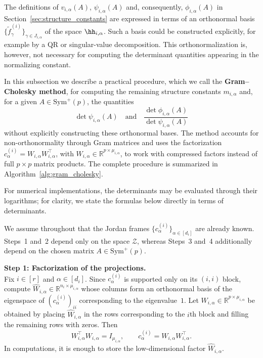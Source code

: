 \documentclass[12pt]{amsart}
\theoremstyle{plain}
\theoremstyle{definition}
\theoremstyle{remark}
\newcommand{\R}{\mathbb{R}}
\newcommand{\1}{\mathbf{1}}
\begin{document}
The definitions of $v_{i,\alpha}(A)$, $\psi_{i,\alpha}(A)$ and,
consequently, $\phi_{i,\alpha}(A)$ in
Section~\ref{sec:structure_constants} are expressed in terms of an
orthonormal basis
$\{\tilde f_\gamma^{(i)}\}_{\gamma\in J_{i,\alpha}}$
of the space $\hh_{i,\alpha}$.
Such a basis could be constructed explicitly, for example by a QR or
singular-value decomposition. This orthonormalization is, however, not
necessary for computing the determinant quantities appearing in the
normalizing constant.

In this subsection we describe a practical procedure, which we call the
\textbf{Gram--Cholesky method}, for computing the remaining structure
constants $m_{i,\alpha}$ and, for a given $A\in\mathrm{Sym}^+(p)$,
the quantities
\[
  \det\psi_{i,\alpha}(A)
  \quad\mbox{and}\quad
  \frac{\det\phi_{i,\alpha}(A)}
       {\det\psi_{i,\alpha}(A)}
\]
without explicitly constructing these orthonormal bases.
The method accounts for non-orthonormality through Gram matrices
and uses the factorization
$c_\alpha^{(i)}=W_{i,\alpha}W_{i,\alpha}^{\top}$,
with $W_{i,\alpha}\in\R^{p\times\mu_{i,\alpha}}$,
to work with compressed factors instead of full $p\times p$
matrix products.
The complete procedure is summarized in
Algorithm~\ref{alg:gram_cholesky}.

For numerical implementations, the determinants may be evaluated
through their logarithms; for clarity, we state the formulas below
directly in terms of determinants.

We assume throughout that the Jordan frames
$\{c_\alpha^{(i)}\}_{\alpha\in[d_i]}$ are already known.
Steps~1 and~2 depend only on the space $\mathcal Z$, whereas
Steps~3 and~4 additionally depend on the chosen matrix
$A\in\mathrm{Sym}^+(p)$.


\noindent\textbf{Step 1: Factorization of the projections.}\\
Fix $i\in[r]$ and $\alpha\in[d_i]$.
Since $c_\alpha^{(i)}$ is supported only on its $(i,i)$ block,
compute $\widehat W_{i,\alpha}\in\R^{n_i\times\mu_{i,\alpha}}$
whose columns form an orthonormal basis of the eigenspace of
$(c_\alpha^{(i)})_{ii}$ corresponding to the eigenvalue~$1$.
Let $W_{i,\alpha}\in\R^{p\times\mu_{i,\alpha}}$ be obtained by
placing $\widehat W_{i,\alpha}$ in the rows corresponding to
the $i$th block and filling the remaining rows with zeros.
Then
\[
  W_{i,\alpha}^\top W_{i,\alpha}=I_{\mu_{i,\alpha}},
  \qquad
  c_\alpha^{(i)}=W_{i,\alpha}W_{i,\alpha}^\top.
\]
In computations, it is enough to store the low-dimensional factor
$\widehat W_{i,\alpha}$.
\end{document}
